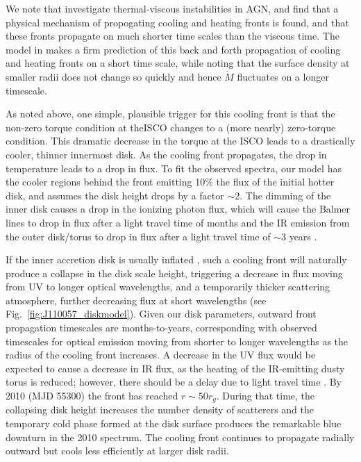 \documentclass[a4paper,fleqn,usenatbib]{mnras}
\begin{document}
We note that \citet{Hameury2009} investigate thermal-viscous
instabilities in AGN, and find that a physical mechanism of
propogating cooling and heating fronts is found, and that these fronts
propagate on much shorter time scales than the viscous time.  The
model in \citet{Hameury2009} makes a firm prediction of this back and
forth propagation of cooling and heating fronts on a short time scale,
while noting that the surface density at smaller radii does not change
so quickly and hence $\dot{M}$ fluctuates on a longer timescale.

As noted above, one simple,
plausible trigger for this cooling front is that the non-zero torque
condition at theISCO changes to a (more nearly) zero-torque
condition. This dramatic decrease in the torque at the ISCO leads to a
drastically cooler, thinner innermost disk. As the cooling front
propagates, the drop in temperature leads to a drop in flux. To fit
the observed spectra, our model has the cooler regions behind the
front emitting 10\% the flux of the initial hotter disk, and assumes
the disk height drops by a factor $\sim$2. The dimming of the inner
disk causes a drop in the ionizing photon flux, which will cause the
Balmer lines to drop in flux after a light travel time of months and
the IR emission from the outer disk/torus to drop in flux after a
light travel time of $\sim$3 years \citep{Sirko_Goodman2003,
Koshida2014, Jun2015}.

If the inner accretion disk is usually inflated \citet[see e.g.,
][]{Sirko_Goodman2003, Thompson2005, Hopkins_Quataert2011}, such a
cooling front will naturally produce a collapse in the disk scale
height, triggering a decrease in flux moving from UV to longer optical
wavelengths, and a temporarily thicker scattering atmosphere, further
decreasing flux at short wavelengths (see
Fig.~\ref{fig:J110057_diskmodel}).  Given our disk parameters, outward
front propagation timescales are months-to-years, corresponding with
observed timescales for optical emission moving from shorter to longer
wavelengths as the radius of the cooling front increases. A decrease
in the UV flux would be expected to cause a decrease in IR flux, as
the heating of the IR-emitting dusty torus is reduced; however, there
should be a delay due to light travel time \citet[e.g.,
][]{Jun2015}. By 2010 (MJD 55300) the front has reached $r\sim50
r_{g}$. During that time, the collapsing disk height increases the
number density of scatterers and the temporary cold phase formed at
the disk surface produces the remarkable blue downturn in the 2010
spectrum. The cooling front continues to propagate radially outward
but cools less efficiently at larger disk radii.
\end{document}
